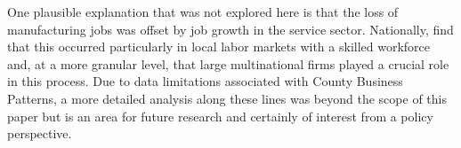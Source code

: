 \documentclass[onehalfspacing,11pt]{article}
\begin{document}
One plausible explanation that was not explored here is that the loss of manufacturing jobs was offset by job growth in the service sector. Nationally, \cite{Bloom:2019} find that this occurred particularly in local labor markets with a skilled workforce and, at a more granular level, that large multinational firms played a crucial role in this process. Due to data limitations associated with County Business Patterns, a more detailed analysis along these lines was beyond the scope of this paper but is an area for future research and certainly of interest from a policy perspective.
%       
%        
%        

\newpage


\end{document}
